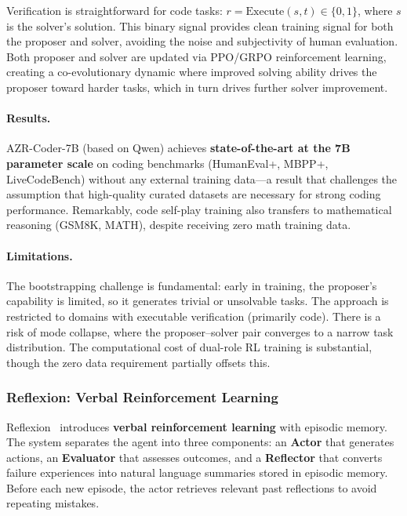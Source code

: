 Verification is straightforward for code tasks: $r = \text{Execute}(s, t) \in \{0, 1\}$, where $s$ is the solver's solution. This binary signal provides clean training signal for both the proposer and solver, avoiding the noise and subjectivity of human evaluation. Both proposer and solver are updated via PPO/GRPO reinforcement learning, creating a co-evolutionary dynamic where improved solving ability drives the proposer toward harder tasks, which in turn drives further solver improvement.

\paragraph{Results.}
AZR-Coder-7B (based on Qwen) achieves \textbf{state-of-the-art at the 7B parameter scale} on coding benchmarks (HumanEval+, MBPP+, LiveCodeBench) without any external training data---a result that challenges the assumption that high-quality curated datasets are necessary for strong coding performance. Remarkably, code self-play training also transfers to mathematical reasoning (GSM8K, MATH), despite receiving zero math training data.

\paragraph{Limitations.}
The bootstrapping challenge is fundamental: early in training, the proposer's capability is limited, so it generates trivial or unsolvable tasks. The approach is restricted to domains with executable verification (primarily code). There is a risk of mode collapse, where the proposer--solver pair converges to a narrow task distribution. The computational cost of dual-role RL training is substantial, though the zero data requirement partially offsets this.


\subsubsection{Reflexion: Verbal Reinforcement Learning}

Reflexion~\citep{reflexion2023} introduces \textbf{verbal reinforcement learning} with episodic memory. The system separates the agent into three components: an \textbf{Actor} that generates actions, an \textbf{Evaluator} that assesses outcomes, and a \textbf{Reflector} that converts failure experiences into natural language summaries stored in episodic memory. Before each new episode, the actor retrieves relevant past reflections to avoid repeating mistakes.

